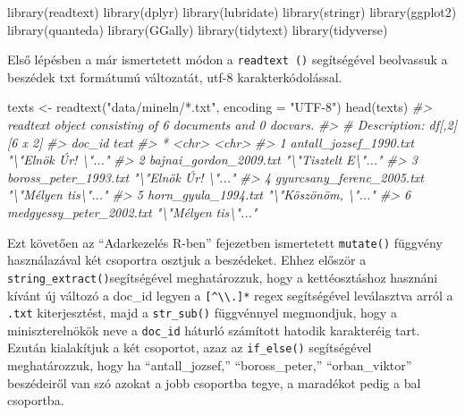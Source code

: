\documentclass[
]{book}
\newenvironment{Shaded}{\begin{snugshade}}{\end{snugshade}}
\newcommand{\AttributeTok}[1]{\textcolor[rgb]{0.77,0.63,0.00}{#1}}
\newcommand{\CommentTok}[1]{\textcolor[rgb]{0.56,0.35,0.01}{\textit{#1}}}
\newcommand{\FunctionTok}[1]{\textcolor[rgb]{0.00,0.00,0.00}{#1}}
\newcommand{\NormalTok}[1]{#1}
\newcommand{\OtherTok}[1]{\textcolor[rgb]{0.56,0.35,0.01}{#1}}
\newcommand{\StringTok}[1]{\textcolor[rgb]{0.31,0.60,0.02}{#1}}
\begin{document}
\begin{Shaded}
\begin{Highlighting}[]
\FunctionTok{library}\NormalTok{(readtext)}
\FunctionTok{library}\NormalTok{(dplyr)}
\FunctionTok{library}\NormalTok{(lubridate)}
\FunctionTok{library}\NormalTok{(stringr)}
\FunctionTok{library}\NormalTok{(ggplot2)}
\FunctionTok{library}\NormalTok{(quanteda)}
\FunctionTok{library}\NormalTok{(GGally)}
\FunctionTok{library}\NormalTok{(tidytext)}
\FunctionTok{library}\NormalTok{(tidyverse)}
\end{Highlighting}
\end{Shaded}

Első lépésben a már ismertetett módon a \texttt{readtext\ ()}
segítségével beolvassuk a beszédek txt formátumú változatát, utf-8
karakterkódolással.

\begin{Shaded}
\begin{Highlighting}[]
\NormalTok{texts }\OtherTok{\textless{}{-}} \FunctionTok{readtext}\NormalTok{(}\StringTok{"data/mineln/*.txt"}\NormalTok{, }\AttributeTok{encoding =} \StringTok{"UTF{-}8"}\NormalTok{)}
\FunctionTok{head}\NormalTok{(texts)}
\CommentTok{\#\textgreater{} readtext object consisting of 6 documents and 0 docvars.}
\CommentTok{\#\textgreater{} \# Description: df[,2] [6 x 2]}
\CommentTok{\#\textgreater{}   doc\_id                    text               }
\CommentTok{\#\textgreater{} * \textless{}chr\textgreater{}                     \textless{}chr\textgreater{}              }
\CommentTok{\#\textgreater{} 1 antall\_jozsef\_1990.txt    "\textbackslash{}"Elnök Úr! \textbackslash{}"..."}
\CommentTok{\#\textgreater{} 2 bajnai\_gordon\_2009.txt    "\textbackslash{}"Tisztelt E\textbackslash{}"..."}
\CommentTok{\#\textgreater{} 3 boross\_peter\_1993.txt     "\textbackslash{}"Elnök Úr! \textbackslash{}"..."}
\CommentTok{\#\textgreater{} 4 gyurcsany\_ferenc\_2005.txt "\textbackslash{}"Mélyen tis\textbackslash{}"..."}
\CommentTok{\#\textgreater{} 5 horn\_gyula\_1994.txt       "\textbackslash{}"Köszönöm, \textbackslash{}"..."}
\CommentTok{\#\textgreater{} 6 medgyessy\_peter\_2002.txt  "\textbackslash{}"Mélyen tis\textbackslash{}"..."}
\end{Highlighting}
\end{Shaded}

Ezt követően az ``Adarkezelés R-ben'' fejezetben ismertetett
\texttt{mutate()} függvény használazával két csoportra osztjuk a
beszédeket. Ehhez először a \texttt{string\_extract()}segítségével
meghatározzuk, hogy a kettéosztáshoz hasznáni kívánt új változó a
doc\_id legyen a \texttt{{[}\^{}\textbackslash{}\textbackslash{}.{]}*}
regex segítségével leválasztva arról a \texttt{.txt} kiterjesztést, majd
a \texttt{str\_sub()} függvénnyel megmondjuk, hogy a miniszterelnökök
neve a \texttt{doc\_id} háturló számított hatodik karakteréig tart.
Ezután kialakítjuk a két csoportot, azaz az \texttt{if\_else()}
segítségével meghatározzuk, hogy ha ``antall\_jozsef,''
``boross\_peter,'' ``orban\_viktor'' beszédeiről van szó azokat a jobb
csoportba tegye, a maradékot pedig a bal csoportba.
\end{document}
